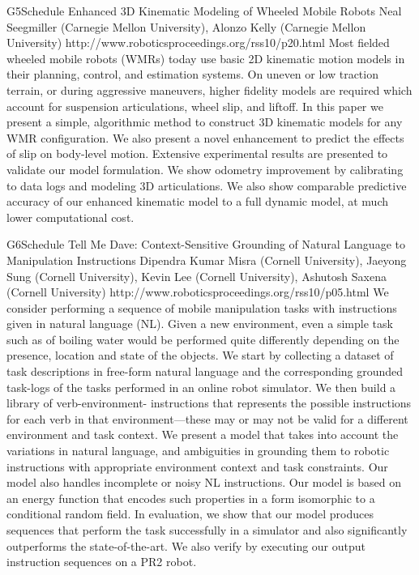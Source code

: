 \begin{spacing}{1.0}
\clearpage
\descriptionPaper
{G5}{Schedule}
{	
Enhanced 3D Kinematic Modeling of Wheeled Mobile Robots
}
{
Neal Seegmiller (Carnegie Mellon University), Alonzo Kelly (Carnegie Mellon University)
}
{
http://www.roboticsproceedings.org/rss10/p20.html
}
{
Most fielded wheeled mobile robots (WMRs) today use basic 2D kinematic motion models in their planning, control, and estimation systems. On uneven or low traction terrain, or during aggressive maneuvers, higher fidelity models are required which account for suspension articulations, wheel slip, and liftoff. In this paper we present a simple, algorithmic method to construct 3D kinematic models for any WMR configuration. We also present a novel enhancement to predict the effects of slip on body-level motion. Extensive experimental results are presented to validate our model formulation. We show odometry improvement by calibrating to data logs and modeling 3D articulations. We also show comparable predictive accuracy of our enhanced kinematic model to a full dynamic model, at much lower computational cost.
}



\descriptionPaper
{G6}{Schedule}
{	
Tell Me Dave: Context-Sensitive Grounding of Natural Language to Manipulation Instructions
}
{
Dipendra Kumar Misra (Cornell University), Jaeyong Sung (Cornell University), Kevin Lee (Cornell University), Ashutosh Saxena (Cornell University)
}
{
http://www.roboticsproceedings.org/rss10/p05.html
}
{
We consider performing a sequence of mobile manipulation tasks with instructions given in natural language (NL). Given a new environment, even a simple task such as of boiling water would be performed quite differently depending on the presence, location and state of the objects. We start by collecting a dataset of task descriptions in free-form natural language and the corresponding grounded task-logs of the tasks performed in an online robot simulator. We then build a library of verb-environment- instructions that represents the possible instructions for each verb in that environment—these may or may not be valid for a different environment and task context. We present a model that takes into account the variations in natural language, and ambiguities in grounding them to robotic instructions with appropriate environment context and task constraints. Our model also handles incomplete or noisy NL instructions. Our model is based on an energy function that encodes such properties in a form isomorphic to a conditional random field. In evaluation, we show that our model produces sequences that perform the task successfully in a simulator and also significantly outperforms the state-of-the-art. We also verify by executing our output instruction sequences on a PR2 robot.
}



\end{spacing}
